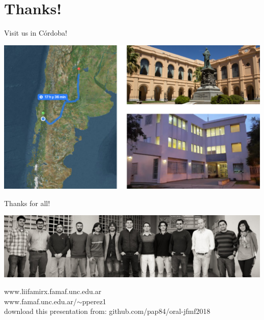 \documentclass[ignorenonframetext,]{beamer}
\begin{document}
\hypertarget{thanks}{%
\section{Thanks!}\label{thanks}}

\begin{frame}{Visit us in Córdoba!}
\protect\hypertarget{visit-us-in-cordoba}{}

\includegraphics{imgs/visitenos.png}

\end{frame}

\begin{frame}{Thanks for all!}
\protect\hypertarget{thanks-for-all}{}

\includegraphics{imgs/liifamir.jpg}

\begin{center}
www.liifamirx.famaf.unc.edu.ar\\
www.famaf.unc.edu.ar/$\sim$pperez1\\
\vspace{.5cm}
\footnotesize download this presentation from: github.com/pap84/oral-jfmf2018
\end{center}

\end{frame}
\end{document}
